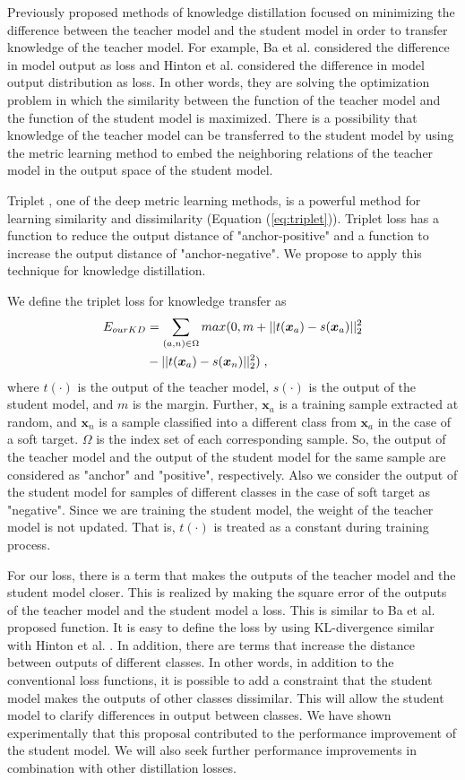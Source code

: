 \documentclass[conference]{IEEEtran}
\begin{document}
Previously proposed methods of knowledge distillation focused on minimizing the difference between the teacher model and the student model in order to transfer knowledge of the teacher model.
For example,  Ba et al. \cite{Ba2014} considered the difference in model output as loss and Hinton et al. \cite{Hinton2015} considered the difference in model output distribution as loss.
In other words, they are solving the optimization problem in which the similarity between the function of the teacher model and the function of the student model is maximized.
There is a possibility that knowledge of the teacher model can be transferred to the student model by using the metric learning method to embed the neighboring relations of the teacher model in the output space of the student model.

Triplet \cite{Hoffer2015}, one of the deep metric learning methods, is a powerful method for learning similarity and dissimilarity (Equation (\ref{eq:triplet})).
Triplet loss has a function to reduce the output distance of "anchor-positive" and a function to increase the output distance of "anchor-negative".
We propose to apply this technique for knowledge distillation.

We define the triplet loss for knowledge transfer as
\begin{align}
    E_{ourKD} &= \sum_{(a,n) \in \Omega} max(0, m + ||t({\bm x_a}) - s({\bm x_a})||_2^2 \notag \\
    &- ||t({\bm x_a}) - s({\bm x_n})||_2^2) \; ,
\end{align}
where $t(\cdot)$ is the output of the teacher model, $s(\cdot)$ is the output of the student model, and $m$ is the margin.
Further, ${\bm x_a}$ is a training sample extracted at random, and ${\bm x_n}$ is a sample classified into a different class from ${\bm x_a}$ in the case of a soft target.
$\Omega$ is the index set of each corresponding sample.
So, the output of the teacher model and the output of the student model for the same sample are considered as "anchor" and "positive", respectively.
Also we consider the output of the student model for samples of different classes in the case of soft target as "negative".
Since we are training the student model, the weight of the teacher model is not updated.
That is, $t(\cdot)$ is treated as a constant during training process.

For our loss, there is a term that makes the outputs of the teacher model and the student model closer. 
This is realized by making the square error of the outputs of the teacher model and the student model a loss.
This is similar to Ba et al. \cite{Ba2014} proposed function.
It is easy to define the loss by using KL-divergence similar with Hinton et al. \cite{Hinton2015}.
In addition, there are terms that increase the distance between outputs of different classes.
In other words, in addition to the conventional loss functions, it is possible to add a constraint that the student model makes the outputs of other classes dissimilar.
This will allow the student model to clarify differences in output between classes.
We have shown experimentally that this proposal contributed to the performance improvement of the student model.
We will also seek further performance improvements in combination with other distillation losses.
\end{document}

